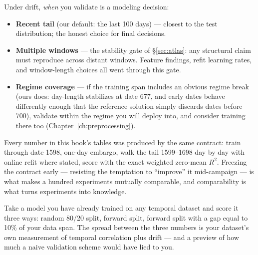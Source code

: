 Under drift, \emph{when} you validate is a modeling decision:

\begin{itemize}
\item \textbf{Recent tail} (our default: the last 100 days) --- closest to
  the test distribution; the honest choice for final decisions.
\item \textbf{Multiple windows} --- the stability gate of
  \S\ref{sec:atlas}: any structural claim must reproduce across distant
  windows. Feature findings, refit learning rates, and window-length
  choices all went through this gate.
\item \textbf{Regime coverage} --- if the training span includes an obvious
  regime break (ours does: day-length stabilizes at date 677, and early
  dates behave differently enough that the reference solution simply
  discards dates before 700), validate within the regime you will deploy
  into, and consider training there too
  (Chapter~\ref{ch:preprocessing}).
\end{itemize}

\begin{jsbox}
Every number in this book's tables was produced by the same contract:
train through date 1598, one-day embargo, walk the tail 1599--1698 day by
day with online refit where stated, score with the exact weighted zero-mean
$R^2$. Freezing the contract early --- resisting the temptation to
``improve'' it mid-campaign --- is what makes a hundred experiments
mutually comparable, and comparability is what turns experiments into
knowledge.
\end{jsbox}

\begin{drillbox}
Take a model you have already trained on any temporal dataset and score it
three ways: random 80/20 split, forward split, forward split with a gap
equal to 10\% of your data span. The spread between the three numbers is
your dataset's own measurement of temporal correlation plus drift --- and a
preview of how much a naive validation scheme would have lied to you.
\end{drillbox}
